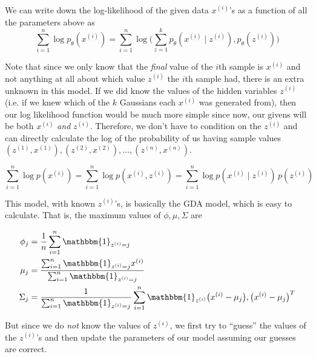   We can write down the log-likelihood of the given data $x^{(i)}$'s as a function of all the parameters above as
  \begin{equation}
    \sum_{i=1}^n \log p_\theta (x^{(i)}) = \sum_{i=1}^n \log \bigg( \sum_{z=1}^k  p_\theta ( x^{(i)} \mid z^{(i)} ) , p_\theta ( z^{(i)} ) \bigg)
  \end{equation}

  \begin{example}
    Note that since we only know that the \textit{final} value of the $i$th sample is $x^{(i)}$ and not anything at all about which value $z^{(i)}$ the $i$th sample had, there is an extra unknown in this model. If we did know the values of the hidden variables $z^{(i)}$ (i.e. if we knew which of the $k$ Gaussians each $x^{(i)}$ was generated from), then our log likelihood function would be much more simple since now, our givens will be both $x^{(i)}$ \textit{and} $z^{(i)}$. Therefore, we don't have to condition on the $z^{(i)}$ and can directly calculate the log of the probability of us having sample values $(z^{(1)}, x^{(1)}), (z^{(2)}, x^{(2)}), \ldots, (z^{(n)}, x^{(n)})$.

    \begin{equation}
      \sum_{i=1}^n \log p(x^{(i)}) = \sum_{i=1}^n \log p( x^{(i)}, z^{(i)}) = \sum_{i=1}^n \log p( x^{(i)} \mid z^{(i)}) \, p(z^{(i)})
    \end{equation}

    This model, with known $z^{(i)}$'s, is basically the GDA model, which is easy to calculate. That is, the maximum values of $\phi, \mu, \Sigma$ are

    \begin{align*}
      \phi_j & = \frac{1}{n} \sum_{i=1}^n \mathbbm{1}_{z^{(i)} = j} \\
      \mu_j & = \frac{\sum_{i=1}^n \mathbbm{1}_{z^{(i)} = j} x^{(i)}}{\sum_{i=1}^n \mathbbm{1}_{z^{(i)} = j}} \\
      \Sigma_j & = \frac{1}{\sum_{i=1}^n \mathbbm{1}_{z^{(i)} = j}} \sum_{i=1}^n \mathbbm{1}_{z^{(i)}} \big( x^{(i)} - \mu_j \big),\big(x^{(i)} - \mu_j \big)^T
    \end{align*}
  \end{example}

  But since we do \textit{not} know the values of $z^{(i)}$, we first try to ``guess'' the values of the $z^{(i)}$'s and then update the parameters of our model assuming our guesses are correct. 

